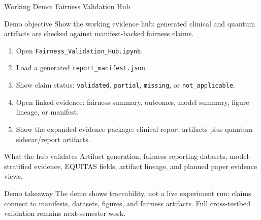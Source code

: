 
\begin{frame}{Working Demo: Fairness Validation Hub}
\small

\begin{block}{Demo objective}
Show the working evidence hub: generated clinical and quantum artifacts are checked against manifest-backed fairness claims.
\end{block}

\vspace{0.2em}

\begin{enumerate}
    \item Open \texttt{Fairness\_Validation\_Hub.ipynb}.
    \item Load a generated \texttt{report\_manifest.json}.
    \item Show claim status: \texttt{validated}, \texttt{partial}, \texttt{missing}, or \texttt{not\_applicable}.
    \item Open linked evidence: fairness summary, outcomes, model summary, figure lineage, or manifest.
    \item Show the expanded evidence package: clinical report artifacts plus quantum sidecar/report artifacts.
\end{enumerate}

\vspace{0.2em}

\begin{block}{What the hub validates}
Artifact generation, fairness reporting datasets, model-stratified evidence, EQUITAS fields, artifact lineage, and planned paper evidence views.
\end{block}

\vspace{0.1em}

\begin{block}{Demo takeaway}
The demo shows traceability, not a live experiment run: claims connect to manifests, datasets, figures, and fairness artifacts. Full cross-testbed validation remains next-semester work.
\end{block}

\end{frame}
